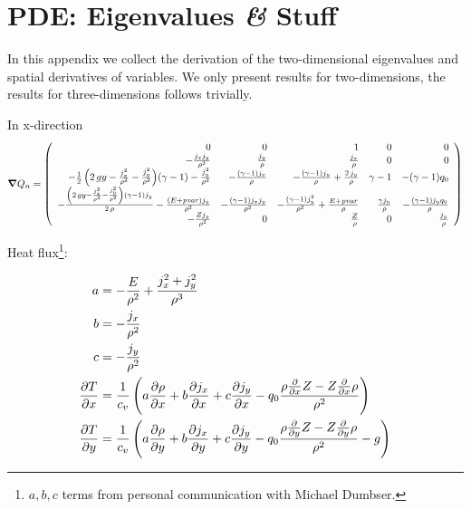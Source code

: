 \chapter{PDE: Eigenvalues \textit{\&} Stuff}
In this appendix we collect the derivation of the two-dimensional eigenvalues and spatial derivatives of variables.
We only present results for two-dimensions, the results for three-dimensions follows trivially.

In x-direction
\begin{equation}
\gradient{Q}_n = \left(\begin{array}{rrrrr}
0 & 0 & 1 & 0 & 0 \\
-\frac{j_{x} j_{y}}{\rho^{2}} & \frac{j_{y}}{\rho} & \frac{j_{x}}{\rho} & 0 & 0 \\
-\frac{1}{2} \, {\left(2 \, g y - \frac{j_{x}^{2}}{\rho^{2}} - \frac{j_{y}^{2}}{\rho^{2}}\right)} {\left(\gamma - 1\right)} - \frac{j_{y}^{2}}{\rho^{2}} & -\frac{{\left(\gamma - 1\right)} j_{x}}{\rho} & -\frac{{\left(\gamma - 1\right)} j_{y}}{\rho} + \frac{2 \, j_{y}}{\rho} & \gamma - 1 & -{\left(\gamma - 1\right)} q_{0} \\
-\frac{{\left(2 \, g y - \frac{j_{x}^{2}}{\rho^{2}} - \frac{j_{y}^{2}}{\rho^{2}}\right)} {\left(\gamma - 1\right)} j_{y}}{2 \, \rho} - \frac{{\left(E + \mathit{pvar}\right)} j_{y}}{\rho^{2}} & -\frac{{\left(\gamma - 1\right)} j_{x} j_{y}}{\rho^{2}} & -\frac{{\left(\gamma - 1\right)} j_{y}^{2}}{\rho^{2}} + \frac{E + \mathit{pvar}}{\rho} & \frac{\gamma j_{y}}{\rho} & -\frac{{\left(\gamma - 1\right)} j_{y} q_{0}}{\rho} \\
-\frac{Z j_{y}}{\rho^{2}} & 0 & \frac{Z}{\rho} & 0 & \frac{j_{y}}{\rho}
\end{array}\right)
\end{equation}


Heat flux\footnote{$a,b,c$ terms from personal communication with Michael Dumbser.}:
\newcommand{\Td}[1]{
  \frac{1}{c_v} \left(
  a \pdv{\rho}{#1} +
  b \pdv{j_x}{#1} +
  c \pdv{j_y}{#1}
 - q_0 \frac{{\rho \frac{\partial}{\partial #1}Z - Z \frac{\partial}{\partial #1}\rho}}{\rho^{2}} 
\IfSubStr{#1}{y}{-g}{}
  \right)
}

\begin{align}
  \begin{split}
  a &=  -\frac{E}{\rho^{2}} + \frac{j_{x}^{2} + j_{y}^{2}}{\rho^{3}} \\
  b &= -\frac{j_{x}}{\rho^{2}}\\
  c &=-\frac{j_{y}}{\rho^{2}}\\
  \pdv{T}{x} &= \Td{x}\\
  \pdv{T}{y} &= \Td{y}
  \end{split}
\end{align}
